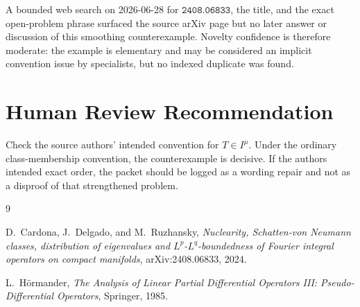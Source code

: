 \documentclass[11pt]{article}
\begin{document}
A bounded web search on 2026-06-28 for \(\texttt{2408.06833}\), the title,
and the exact open-problem phrase surfaced the source arXiv page but no later
answer or discussion of this smoothing counterexample.  Novelty confidence is
therefore moderate: the example is elementary and may be considered an
implicit convention issue by specialists, but no indexed duplicate was found.

\section*{Human Review Recommendation}

Check the source authors' intended convention for \(T\in I^\mu\).  Under the
ordinary class-membership convention, the counterexample is decisive.  If the
authors intended exact order, the packet should be logged as a wording repair
and not as a disproof of that strengthened problem.

\begin{thebibliography}{9}

D.~Cardona, J.~Delgado, and M.~Ruzhansky,
\emph{Nuclearity, Schatten-von Neumann classes, distribution of eigenvalues
and \(L^p\)-\(L^q\)-boundedness of Fourier integral operators on compact
manifolds},
arXiv:2408.06833, 2024.

L.~H\"ormander,
\emph{The Analysis of Linear Partial Differential Operators III:
Pseudo-Differential Operators},
Springer, 1985.

\end{thebibliography}
\end{document}

